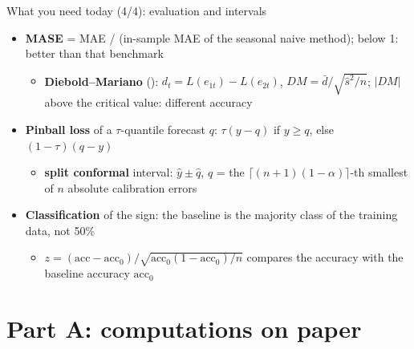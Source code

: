 \begin{frame}{What you need today (4/4): evaluation and intervals}
\itemsize{\footnotesize}
\begin{itemize}
    \item \textbf{MASE} = MAE / (in-sample MAE of the seasonal naive method); below 1: better than that benchmark
    \begin{itemize}
        \item \textbf{Diebold--Mariano} (): $d_t = L(e_{1t}) - L(e_{2t})$, $DM = \bar d / \sqrt{\hat s^2/n}$; $|DM|$ above the critical value: different accuracy
    \end{itemize}
    \item \textbf{Pinball loss} of a $\tau$-quantile forecast $q$: $\tau(y - q)$ if $y \ge q$, else $(1 - \tau)(q - y)$
    \begin{itemize}
        \item \textbf{split conformal} interval: $\hat y \pm \hat q$, $\hat q$ = the $\lceil (n+1)(1 - \alpha) \rceil$-th smallest of $n$ absolute calibration errors
    \end{itemize}
    \item \textbf{Classification} of the sign: the baseline is the majority class of the training data, not 50\%
    \begin{itemize}
        \item $z = (\text{acc} - \text{acc}_0)/\sqrt{\text{acc}_0(1 - \text{acc}_0)/n}$ compares the accuracy with the baseline accuracy $\text{acc}_0$
    \end{itemize}
\end{itemize}
\end{frame}


\section{Part A: computations on paper}

